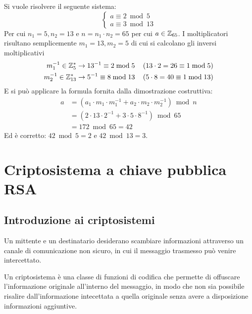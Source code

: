 Si vuole risolvere il seguente sistema:
\begin{equation*}
    \begin{cases}
        a \equiv 2 \bmod 5
        \\
        a \equiv 3 \bmod 13
    \end{cases}
\end{equation*}
Per cui $
n_1 = 5
,
n_2 = 13
$ e $
n = n_1 \cdot n_2 = 65
$ per cui $
a \in \mathbb{Z}_{65} 
$.
I moltiplicatori risultano semplicemente $
m_1 = 13
,
m_2 = 5
$ di cui si calcolano gli inversi moltiplicativi 
\begin{align*}
    m_1^{-1} \in \mathbb{Z}_{5}^{*} 
    \rightarrow
    13^{-1} \equiv 2 \bmod 5
    \quad
    \left( 
        13 \cdot 2 = 26 \equiv 1 \bmod 5
    \right)
    \\
    m_2^{-1} \in \mathbb{Z}_{13}^{*} 
    \rightarrow
    5^{-1} \equiv 8 \bmod 13
    \quad
    \left( 
        5 \cdot 8 = 40 \equiv 1 \bmod 13
    \right)
\end{align*}
E si può applicare la formula fornita dalla dimostrazione costruttiva:
\begin{align*}
    a &= 
    \left( 
        a_1 \cdot
        m_1 \cdot
        m_1^{-1} +
        a_2 \cdot
        m_2 \cdot
        m_2^{-1}
    \right)
    \bmod n
    \\
    &= 
    \left( 
        2 \cdot
        13 \cdot
        2^{-1} +
        3 \cdot
        5 \cdot
        8^{-1}
    \right)
    \bmod 65
    \\
    &= 172 \bmod 65 = 42
\end{align*}
Ed è corretto: $
42 \bmod 5 = 2
$ e $
42 \bmod 13 = 3
$.

\section{Criptosistema a chiave pubblica RSA}

\subsection{Introduzione ai criptosistemi}

Un mittente e un destinatario desiderano scambiare informazioni attraverso un canale di comunicazione non sicuro,
in cui il messaggio trasmesso può venire intercettato.

Un criptosistema è una classe di funzioni di codifica che permette di offuscare l'informazione originale all'interno del messaggio, in modo che non sia possibile risalire dall'informazione intecettata a quella originale senza avere a disposizione informazioni aggiuntive.

